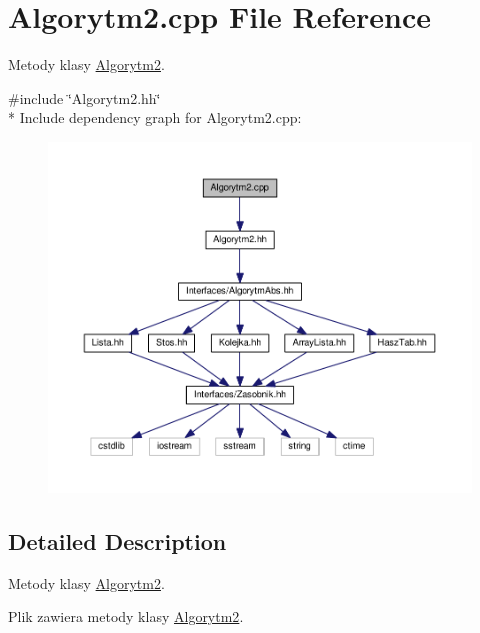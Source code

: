 \hypertarget{a00020}{}\section{Algorytm2.\+cpp File Reference}
\label{a00020}


Metody klasy \hyperlink{a00003}{Algorytm2}.  


{\ttfamily \#include \char`\"{}Algorytm2.\+hh\char`\"{}}\\*
Include dependency graph for Algorytm2.\+cpp\+:
\nopagebreak
\begin{figure}[H]
\begin{center}
\leavevmode
\includegraphics[width=350pt]{a00056}
\end{center}
\end{figure}


\subsection{Detailed Description}
Metody klasy \hyperlink{a00003}{Algorytm2}. 

Plik zawiera metody klasy \hyperlink{a00003}{Algorytm2}. 